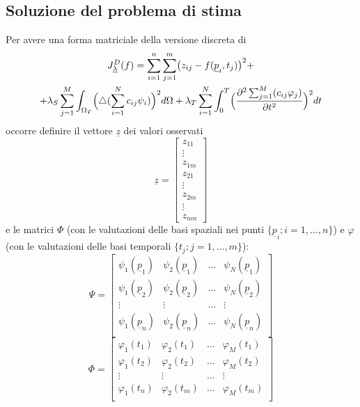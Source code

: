 \documentclass[a4paper,11pt,twoside,openright]{book}							%
\begin{document}
\subsection*{Soluzione del problema di stima}
Per avere una forma matriciale della versione discreta di 
\begin{multline*}
J_{\underline \lambda }^D(f)= \sum_{i=1}^n \sum_{j=1}^m \bigl( z_{ij} - f(\underline p_i,t_j) \bigr)^2 + \\
+ \lambda_S  \sum_{j=1}^M \int_{\Omega_T} \Bigl( \triangle(\sum_{i=1}^N  c_{ij}\psi_i ) \Bigr)^2 d \Omega + \lambda_T \sum_{i=1}^N\int_0^T \Bigl( \frac{\partial^2 \sum_{j=1}^M(c_{ij}\varphi_j) }{\partial t ^2} \Bigr)^2 dt
\end{multline*}
 occorre definire il vettore $\underline z$ dei valori osservati 
\begin{equation}
\underline z =
\begin{bmatrix}
z_{11}  \\
\vdots\\
z_{1m}  \\
z_{21}  \\
\vdots\\
z_{2m}  \\
\vdots\\
z_{nm}
\end{bmatrix}
\end{equation}
e le matrici $\Phi$ (con le valutazioni delle basi spaziali nei punti $\{\underline p_i; i = 1,\ldots,n\}$) e $\varphi$ (con le valutazioni delle basi temporali $\{t_j; j = 1,\ldots,m\}$):
$$
\Psi =
\begin{bmatrix}
\psi_{1}(\underline p_1) & \psi_{2}(\underline p_1) & \hdots & \psi_{N}(\underline p_1)  \\
\psi_{1}(\underline p_2) & \psi_{2}(\underline p_2) & \hdots & \psi_{N}(\underline p_2)  \\
\vdots & \vdots & \hdots & \vdots \\
\psi_{1}(\underline p_n) & \psi_{2}(\underline p_n) & \hdots & \psi_{N}(\underline p_n)  \\
\end{bmatrix}
$$
$$
\Phi = 
\begin{bmatrix}
\varphi_{1}( t_1) & \varphi_{2}( t_1) & \hdots & \varphi_{M}( t_1)  \\
\varphi_{1}( t_2) & \varphi_{2}( t_2) & \hdots & \varphi_{M}( t_2)  \\
\vdots & \vdots & \hdots & \vdots \\
\varphi_{1}( t_n) & \varphi_{2}( t_m) & \hdots & \varphi_{M}( t_m)  \\
\end{bmatrix}
$$
\end{document}
